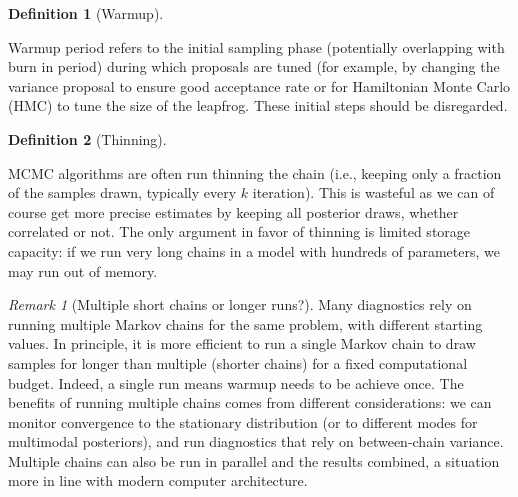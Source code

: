 \documentclass[
  11pt,
  letterpaper,
]{scrbook}
\theoremstyle{definition}
\newtheorem{definition}{Definition}[chapter]
\theoremstyle{plain}
\theoremstyle{plain}
\theoremstyle{plain}
\theoremstyle{definition}
\theoremstyle{definition}
\theoremstyle{remark}
\newtheorem{refremark}{Remark}[chapter]
\begin{document}
\begin{definition}[Warmup]\protect\hypertarget{def-warmup}{}\label{def-warmup}

Warmup period refers to the initial sampling phase (potentially
overlapping with burn in period) during which proposals are tuned (for
example, by changing the variance proposal to ensure good acceptance
rate or for Hamiltonian Monte Carlo (HMC) to tune the size of the
leapfrog. These initial steps should be disregarded.

\end{definition}

\begin{definition}[Thinning]\protect\hypertarget{def-thinning}{}\label{def-thinning}

MCMC algorithms are often run thinning the chain (i.e., keeping only a
fraction of the samples drawn, typically every \(k\) iteration). This is
wasteful as we can of course get more precise estimates by keeping all
posterior draws, whether correlated or not. The only argument in favor
of thinning is limited storage capacity: if we run very long chains in a
model with hundreds of parameters, we may run out of memory.

\end{definition}

\begin{refremark}[Multiple short chains or longer runs?]
Many diagnostics rely on running multiple Markov chains for the same
problem, with different starting values. In principle, it is more
efficient to run a single Markov chain to draw samples for longer than
multiple (shorter chains) for a fixed computational budget. Indeed, a
single run means warmup needs to be achieve once. The benefits of
running multiple chains comes from different considerations: we can
monitor convergence to the stationary distribution (or to different
modes for multimodal posteriors), and run diagnostics that rely on
between-chain variance. Multiple chains can also be run in parallel and
the results combined, a situation more in line with modern computer
architecture.

\label{rem-short-vs-long}

\end{refremark}
\end{document}
